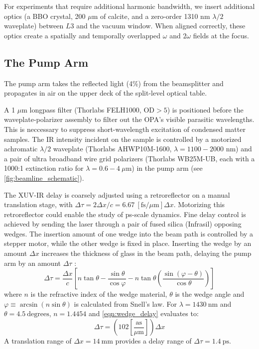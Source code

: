 For experiments that require additional harmonic bandwidth, we insert additional optics (a BBO crystal, 200 $\mu$m of calcite, and a zero-order 1310 nm $\lambda/2$ waveplate) between $L3$ and the vacuum window. When aligned correctly, these optics create a spatially and temporally overlapped $\omega$ and $2\omega$ fields at the focus.

\subsection{The Pump Arm}

The pump arm takes the reflected light (4\%) from the beamsplitter and propagates in air on the upper deck of the split-level optical table.

A 1 $\mu$m longpass filter (Thorlabs FELH1000, $\text{OD}>5$) is positioned before the waveplate-polarizer assembly to filter out the OPA's visible parasitic wavelengths. This is neccessary to suppress short-wavelength excitation of condensed matter samples. The IR intensity incident on the sample is controlled by a motorized achromatic $\lambda/2$ waveplate (Thorlabs AHWP10M-1600, $\lambda = 1100 - 2000$ nm) and a pair of ultra broadband wire grid polarizers (Thorlabs WB25M-UB, each with a 1000:1 extinction ratio for $\lambda = 0.6 - 4 \ \mu \text{m}$) in the pump arm (see \cref{fig:beamline_schematic}). 

The XUV-IR delay is coarsely adjusted using a retroreflector on a manual translation stage, with $\Delta \tau = 2 \Delta x / c =  6.67 \ \left[ \textrm{fs}/ \mu \textrm{m} \right] \Delta x$. Motorizing this retroreflector could enable the study of ps-scale dynamics. Fine delay control is achieved by sending the laser through a pair of fused silica (Infrasil) opposing wedges. The insertion amount of one wedge into the beam path is controlled by a stepper motor, while the other wedge is fixed in place. Inserting the wedge by an amount $\Delta x$ increases the thickness of glass in the beam path, delaying the pump arm by an amount $\Delta \tau$ \cite{hagemanComplexAttosecondTransientAbsorption2020}:
\begin{equation}
\Delta \tau = \frac{\Delta x}{c} \left[ n \tan \theta - \frac{\sin \theta}{\cos \varphi} - n \tan \theta \left( \frac{\sin \left(\varphi - \theta \right)}{\cos \theta}\right) \right]
\label{eqn:wedge_delay}
\end{equation}
where $n$ is the refractive index of the wedge material, $\theta$ is the wedge angle and ${\varphi \equiv \arcsin \left( n \sin \theta \right)}$ is calculated from Snell's law. For $\lambda = 1430 \ \textrm{nm}$ and $\theta = 4.5 \ \textrm{degrees}$, $n=1.4454$ \cite{malitsonInterspecimenComparisonRefractive1965} and \cref{eqn:wedge_delay} evaluates to:
\begin{equation}
\Delta \tau = \left( 102 \left[ \frac{\textrm{as}}{\mu \textrm{m}}\right]\right) \Delta x
\end{equation}
A translation range of $\Delta x = 14 \ \textrm{mm}$ provides a delay range of $\Delta \tau =  1.4 \ \textrm{ps}$.

